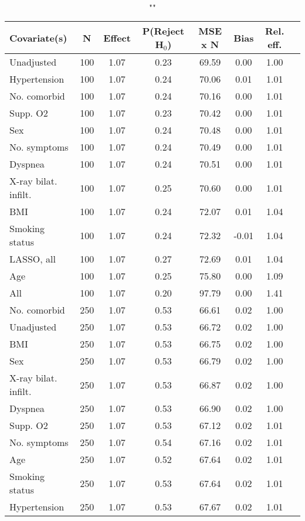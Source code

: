\documentclass{article}
\begin{document}
{\tabcolsep=6pt  %
\begin{longtable}{lccccccc}
\caption{""} \\
Covariate(s) & N & Effect & P(Reject H$_0$) & MSE x N & Bias & Rel. eff.\\ \midrule
Unadjusted & 100 & 1.07 & 0.23 & 69.59 &  0.00 & 1.00 \\ 
Hypertension & 100 & 1.07 & 0.24 & 70.06 &  0.01 & 1.01 \\ 
No. comorbid & 100 & 1.07 & 0.24 & 70.16 &  0.00 & 1.01 \\ 
Supp. O2 & 100 & 1.07 & 0.23 & 70.42 &  0.00 & 1.01 \\ 
Sex & 100 & 1.07 & 0.24 & 70.48 &  0.00 & 1.01 \\ 
No. symptoms & 100 & 1.07 & 0.24 & 70.49 &  0.00 & 1.01 \\ 
Dyspnea & 100 & 1.07 & 0.24 & 70.51 &  0.00 & 1.01 \\ 
X-ray bilat. infilt. & 100 & 1.07 & 0.25 & 70.60 &  0.00 & 1.01 \\ 
BMI & 100 & 1.07 & 0.24 & 72.07 &  0.01 & 1.04 \\ 
Smoking status & 100 & 1.07 & 0.24 & 72.32 & -0.01 & 1.04 \\ 
LASSO, all & 100 & 1.07 & 0.27 & 72.69 &  0.01 & 1.04 \\ 
Age & 100 & 1.07 & 0.25 & 75.80 &  0.00 & 1.09 \\ 
All & 100 & 1.07 & 0.20 & 97.79 &  0.00 & 1.41 \\ \midrule 
No. comorbid & 250 & 1.07 & 0.53 & 66.61 &  0.02 & 1.00 \\ 
Unadjusted & 250 & 1.07 & 0.53 & 66.72 &  0.02 & 1.00 \\ 
BMI & 250 & 1.07 & 0.53 & 66.75 &  0.02 & 1.00 \\ 
Sex & 250 & 1.07 & 0.53 & 66.79 &  0.02 & 1.00 \\ 
X-ray bilat. infilt. & 250 & 1.07 & 0.53 & 66.87 &  0.02 & 1.00 \\ 
Dyspnea & 250 & 1.07 & 0.53 & 66.90 &  0.02 & 1.00 \\ 
Supp. O2 & 250 & 1.07 & 0.53 & 67.12 &  0.02 & 1.01 \\ 
No. symptoms & 250 & 1.07 & 0.54 & 67.16 &  0.02 & 1.01 \\ 
Age & 250 & 1.07 & 0.52 & 67.64 &  0.02 & 1.01 \\ 
Smoking status & 250 & 1.07 & 0.53 & 67.64 &  0.02 & 1.01 \\ 
Hypertension & 250 & 1.07 & 0.53 & 67.67 &  0.02 & 1.01 \\ 

\end{longtable}}
\end{document}
